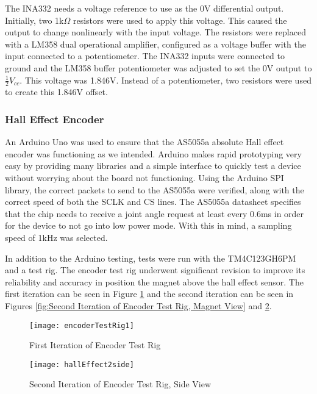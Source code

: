 \noindent The INA332 needs a voltage reference to use as the 0V differential output. Initially, two 1k$\Omega$ resistors were used to apply this voltage. This caused the output to change nonlinearly with the input voltage. The resistors were replaced with a LM358 dual operational amplifier, configured as a voltage buffer with the input connected to a potentiometer. The INA332 inputs were connected to ground and the LM358 buffer potentiometer was adjusted to set the 0V output to  $\frac{1}{2} V_{cc}$. This voltage was 1.846V. Instead of a potentiometer, two resistors were used to create this 1.846V offset.

\subsubsection{Hall Effect Encoder}
An Arduino Uno was used to ensure that the AS5055a absolute Hall effect encoder was functioning as we intended. Arduino makes rapid prototyping very easy by providing many libraries and a simple interface to quickly test a device without worrying about the board not functioning. Using the Arduino SPI library, the correct packets to send to the AS5055a were verified, along with the correct speed of both the SCLK and CS lines. The AS5055a datasheet specifies that the chip needs to receive a joint angle request at least every 0.6ms in order for the device to not go into low power mode. With this in mind, a sampling speed of 1kHz was selected.

\noindent In addition to the Arduino testing, tests were run with the TM4C123GH6PM and a test rig. The encoder test rig underwent significant revision to improve its reliability and accuracy in position the magnet above the hall effect sensor. The first iteration can be seen in Figure \ref{fig:First Iteration of Encoder Test Rig} and the second iteration can be seen in Figures \ref{fig:Second Iteration of Encoder Test Rig, Magnet View} and \ref{fig:Second Iteration of Encoder Test Rig, Side View}.

\begin{figure}[H]
	\centering
	\texttt{[image: encoderTestRig1]}
	\caption{First Iteration of Encoder Test Rig}
	\label{fig:First Iteration of Encoder Test Rig}
\end{figure}


\begin{figure}[H]
	\centering
	\texttt{[image: hallEffect2side]}
	\caption{Second Iteration of Encoder Test Rig, Side View}
	\label{fig:Second Iteration of Encoder Test Rig, Side View}
\end{figure}

